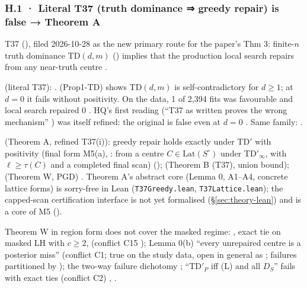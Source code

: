 \subsubsection*{H.1 · Literal T37 (truth dominance ⇒ greedy repair) is false → Theorem A}
\begin{description}[leftmargin=1.3em,style=unboxed,font=\normalfont]
\item[\textbf{Claim.}] T37 (), filed 2026-10-28 as the new primary route for the paper's Thm 3: finite-$n$ truth dominance TD$(d,m)$ () implies that the production local search repairs from any near-truth centre .
\item[\textbf{Failed.}]  (literal T37):  .  (Prop1-TD) shows TD$(d,m)$ is self-contradictory for $d\ge1$; at $d=0$ it fails without positivity. On the data, 1 of 2,394 fits was favourable and local search repaired 0 . HQ's first reading (``T37 as written proves the wrong mechanism'' ) was itself refined: the original is false even at $d=0$ . Same family: .
\item[\textbf{Replacement.}]  (Theorem A, refined T37(i)): greedy repair holds exactly under TD$'$ with positivity (final form M5(a), : from a centre $C\in\mathrm{Lat}(S^\circ)$ under TD$'_{\infty}$, with $\ell\ge\tau(C)$ and a completed final scan) ();  (Theorem B (T37), union bound);  (Theorem W, PGD) . Theorem A's abstract core (Lemma 0, A1--A4, concrete lattice forms) is sorry-free in Lean (\texttt{T37Greedy.lean}, \texttt{T37Lattice.lean}); the capped-scan certification interface is not yet formalised (\S\ref{sec:theory-lean})  and is a core of M5 ().
\item[\textbf{Side refutations.}] Theorem W in region form does not cover the masked regime: , exact tie on masked LH with $c\ge2$,  (conflict C15 ); Lemma 0(b) ``every unrepaired centre is a posterior miss''  (conflict C1; true on the study data, open in general as ; failures partitioned by ); the two-way failure dichotomy ; ``TD$'_P$ iff (L) and all $D_S$'' fails with exact ties  (conflict C2) , .
\end{description}

